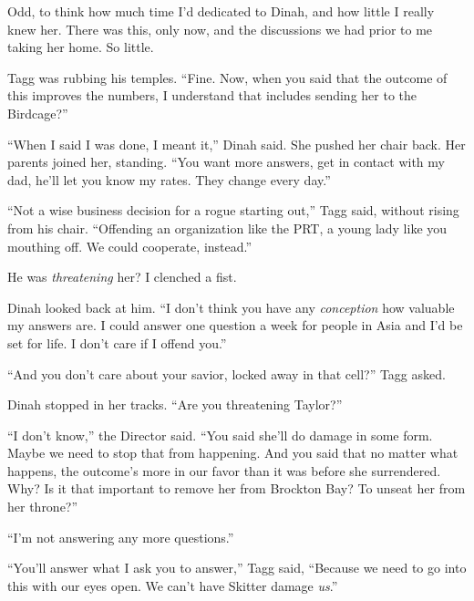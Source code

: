 Odd, to think how much time I'd dedicated to Dinah, and how little I really knew her.  There was this, only now, and the discussions we had prior to me taking her home.  So little.



Tagg was rubbing his temples.  ``Fine.  Now, when you said that the outcome of this improves the numbers, I understand that includes sending her to the Birdcage?''



``When I said I was done, I meant it,'' Dinah said.  She pushed her chair back.  Her parents joined her, standing.  ``You want more answers, get in contact with my dad, he'll let you know my rates.  They change every day.''



``Not a wise business decision for a rogue starting out,'' Tagg said, without rising from his chair.  ``Offending an organization like the PRT, a young lady like you mouthing off.  We could cooperate, instead.''



He was \emph{threatening} her?  I clenched a fist.



Dinah looked back at him.  ``I don't think you have any \emph{conception} how valuable my answers are.  I could answer one question a week for people in Asia and I'd be set for life.  I don't care if I offend you.''



``And you don't care about your savior, locked away in that cell?'' Tagg asked.



Dinah stopped in her tracks.  ``Are you threatening Taylor?''



``I don't know,'' the Director said.  ``You said she'll do damage in some form.  Maybe we need to stop that from happening.  And you said that no matter what happens, the outcome's more in our favor than it was before she surrendered.  Why?  Is it that important to remove her from Brockton Bay?  To unseat her from her throne?''



``I'm not answering any more questions.''



``You'll answer what I ask you to answer,'' Tagg said, ``Because we need to go into this with our eyes open.  We can't have Skitter damage \emph{us}.''



